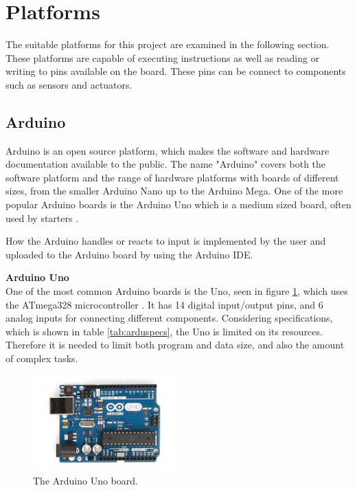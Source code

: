 \section{Platforms}
The suitable platforms for this project are examined in the following section. These platforms are capable of executing instructions as well as reading or writing to pins available on the board. These pins can be connect to components such as sensors and actuators.

\subsection{Arduino}\label{sec:arduino}
Arduino is an open source platform, which makes the software and hardware documentation available to the public. The name "Arduino" covers both the software platform and the range of hardware platforms with boards of different sizes, from the smaller Arduino Nano up to the Arduino Mega. One of the more popular Arduino boards is the Arduino Uno which is a medium sized board, often used by starters \cite{arduinouno}.

How the Arduino handles or reacts to input is implemented by the user and uploaded to the Arduino board by using the Arduino IDE.

\textbf{Arduino Uno}\\
One of the most common Arduino boards is the Uno, seen in figure \ref{fig:arduinouno}, which uses the ATmega328 microcontroller \cite{arduinouno}. It has 14 digital input/output pins, and 6 analog inputs for connecting different components. Considering specifications, which is shown in table \ref{tab:arduspecs}, the Uno is limited on its resources. Therefore it is needed to limit both program and data size, and also the amount of complex tasks.

\begin{figure}[h!]
\centering
\includegraphics[width=0.5\textwidth]{chapters/analysis/figs/ArduinoUno.jpg}
\caption{The Arduino Uno board\cite{arduinointroduction}.}
\label{fig:arduinouno}
\end{figure}


